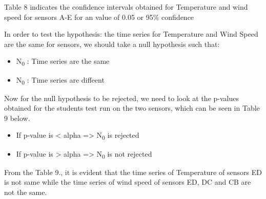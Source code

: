 \documentclass[a4paper]{article}
\begin{document}
Table 8 indicates the confidence intervals obtained for Temperature and wind speed for sensors A-E for an \alpha{} value of 0.05 or 95\% confidence

{
\small
\begin{table}[htbp]
  \centering
  \caption{Confidence intervals of Temperature and wind speed variables of all sensors}
\end{table}
}

In order to test the hypothesis: the time series for Temperature and Wind Speed are the same for sensors, we should take a null hypothesis such that:
\begin{itemize}
  \item N\textsubscript{0} : Time series are the same
  \item N\textsubscript{0} : Time series are diffeent
\end{itemize}
Now for the null hypothesis to be rejected, we need to look at the p-values obtained for the students test run on the two sensors, which can be seen in Table 9 below.
\begin{itemize}
  \item If p-value is < alpha => N\textsubscript{0} is rejected
  \item If p-value is > alpha => N\textsubscript{0} is not rejected
\end{itemize}
From the Table 9., it is evident that the time series of Temperature of sensors ED is not same while the time series of wind speed of sensors ED, DC and CB are not the same.
\end{document}
